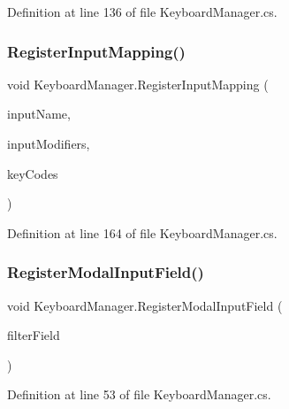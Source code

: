 Definition at line 136 of file Keyboard\+Manager.\+cs.

\mbox{\label{class_keyboard_manager_a6fec4daf08361b0f51fe7f45a60dfcf3}} 
\subsubsection{\texorpdfstring{Register\+Input\+Mapping()}{RegisterInputMapping()}}
{\footnotesize\ttfamily void Keyboard\+Manager.\+Register\+Input\+Mapping (\begin{DoxyParamCaption}\item[{string}]{input\+Name,  }\item[{\hyperlink{_keyboard_input_modifier_8cs_a45c5fbd3fc0bd2cbe0f27f511d6b5955}{Keyboard\+Input\+Modifier}}]{input\+Modifiers,  }\item[{params Key\+Code \mbox{[}$\,$\mbox{]}}]{key\+Codes }\end{DoxyParamCaption})}



Definition at line 164 of file Keyboard\+Manager.\+cs.

\mbox{\label{class_keyboard_manager_a2393502e8ac109543e028bbbd3ed149c}} 
\subsubsection{\texorpdfstring{Register\+Modal\+Input\+Field()}{RegisterModalInputField()}}
{\footnotesize\ttfamily void Keyboard\+Manager.\+Register\+Modal\+Input\+Field (\begin{DoxyParamCaption}\item[{Input\+Field}]{filter\+Field }\end{DoxyParamCaption})}



Definition at line 53 of file Keyboard\+Manager.\+cs.

\mbox{\label{class_keyboard_manager_a9131b36109dcdfb02e7e5c93c523cbdf}} 
